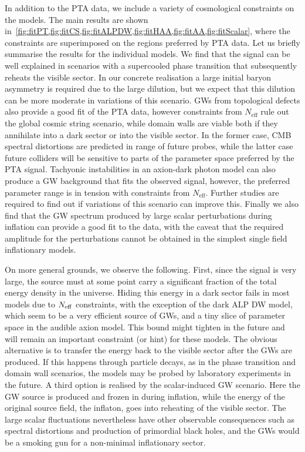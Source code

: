 \documentclass{article}
\newcommand*{\Neff}{\ensuremath{N_\mathrm{eff}}\xspace}
\begin{document}
In addition to the PTA data, we include a variety of cosmological constraints on the models. The main results are shown in~\cref{fig:fitPT,fig:fitCS,fig:fitALPDW,fig:fitHAA,fig:fitAA,fig:fitScalar}, where the constraints are superimposed on the regions preferred by PTA data. Let us briefly summarise the results for the individual models. We find that the signal can be well explained in scenarios with a supercooled phase transition that subsequently reheats the visible sector. In our concrete realisation a large initial baryon asymmetry is required due to the large dilution, but we expect that this dilution can be more moderate in variations of this scenario. GWs from topological defects also provide a good fit of the PTA data, however constraints from $\Neff$ rule out the global cosmic string scenario, while domain walls are viable both if they annihilate into a dark sector or into the visible sector. In the former case, CMB spectral distortions are predicted in range of future probes, while the latter case future colliders will be sensitive to parts of the parameter space preferred by the PTA signal. Tachyonic instabilities in an axion-dark photon model can also produce a GW background that fits the observed signal, however, the preferred parameter range is in tension with constraints from $\Neff$. Further studies are required to find out if variations of this scenario can improve this. Finally we also find that the GW spectrum produced by large scalar perturbations during inflation can provide a good fit to the data, with the caveat that the required amplitude for the perturbations cannot be obtained in the simplest single field inflationary models. 

On more general grounds, we observe the following. First, since the signal is very large, the source must at some point carry a significant fraction of the total energy density in the universe. Hiding this energy in a dark sector fails in most models due to $N_{\rm eff}$ constraints, with the exception of the dark ALP DW model, which seem to be a very efficient source of GWs, and a tiny slice of parameter space in the audible axion model. This bound might tighten in the future and will remain an important constraint (or hint) for these models. The obvious alternative is to transfer the energy back to the visible sector after the GWs are produced. If this happens through particle decays, as in the phase transition and domain wall scenarios, the models may be probed by laboratory experiments in the future. 
A third option is realised by the scalar-induced GW scenario. Here the GW source is produced and frozen in during inflation, while the energy of the original source field, the inflaton, goes into reheating of the visible sector. The large scalar fluctuations nevertheless have other observable consequences such as spectral distortions and production of primordial black holes, and the GWs would be a smoking gun for a non-minimal inflationary sector. 
\end{document}
